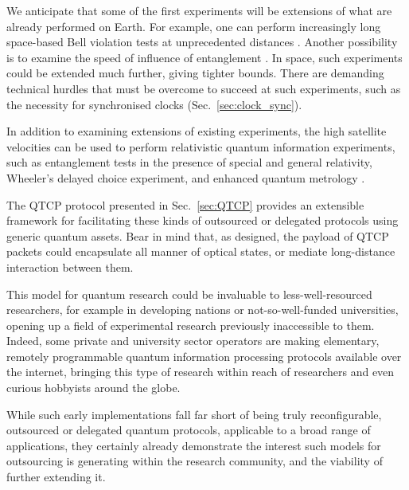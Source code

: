 We anticipate that some of the first experiments will be extensions of what are already performed on Earth. For example, one can perform increasingly long space-based Bell violation tests at unprecedented distances \cite{bib:yin2017satellite}. Another possibility is to examine the speed of influence of entanglement \cite{bib:yin2013lower}. In space, such experiments could be extended much further, giving tighter bounds. There are demanding technical hurdles that must be overcome to succeed at such experiments, such as the necessity for synchronised clocks (Sec.~\ref{sec:clock_sync}).

 In addition to examining extensions of existing experiments, the high satellite velocities can be used to perform relativistic quantum information experiments, such as entanglement tests in the presence of special and general relativity, Wheeler's delayed choice experiment, and enhanced quantum metrology \cite{bib:kaltenbaek2003proof, bib:scheidl2013quantum, bib:ahmadi2014relativistic}.

The QTCP protocol presented in Sec.~\ref{sec:QTCP} provides an extensible framework for facilitating these kinds of outsourced or delegated protocols using generic quantum assets. Bear in mind that, as designed, the payload of QTCP packets could encapsulate all manner of optical states, or mediate long-distance interaction between them.

This model for quantum research could be invaluable to less-well-resourced researchers, for example in developing nations or not-so-well-funded universities, opening up a field of experimental research previously inaccessible to them. Indeed, some private and university sector operators are making elementary, remotely programmable quantum information processing protocols available over the internet, bringing this type of research within reach of researchers and even curious hobbyists around the globe.

While such early implementations fall far short of being truly reconfigurable, outsourced or delegated quantum protocols, applicable to a broad range of applications, they certainly already demonstrate the interest such models for outsourcing is generating within the research community, and the viability of further extending it.


